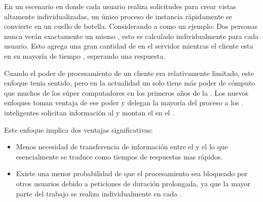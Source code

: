 En un escenario en donde cada usuario realiza solicitudes para crear vistas altamente individualizadas, un único proceso de instancia rápidamente se convierte en un cuello de botella. Considerando a \facebook como un ejemplo: Dos personas nunca verán exactamente un mismo \facebookwall, esto es calculado individualmente para cada usuario. Esto agrega una gran cantidad de \stress en el servidor mientras el cliente esta en su mayoría de tiempo \idle, esperando una respuesta.

Cuando el poder de procesamiento de un cliente era relativamente limitado, este enfoque tenia sentido, pero en la actualidad un solo \smartphone tiene más poder de cómputo que muchos de los súper computadores en los primeros años de la \webINT. Los nuevos enfoques toman ventaja de ese poder y delegan la mayoría del proceso a los \clientsAS. \frontEndsAS inteligentes solicitan información al \serverAS y montan el \htmldomNAME en el \browserINT.

Este enfoque \clientcentric implica dos ventajas significativas:
\begin{itemize}
	\item Menos necesidad de transferencia de información entre el \serverAS y el \clientAS lo que esencialmente se traduce como tiempos de respuestas mas rápidos.
	\item Existe una menor probabilidad de que el procesamiento sea bloqueado por otros usuarios debido a peticiones de duración prolongada, ya que la mayor parte del trabajo se realiza individualmente en cada \clientAS.
\end{itemize}

